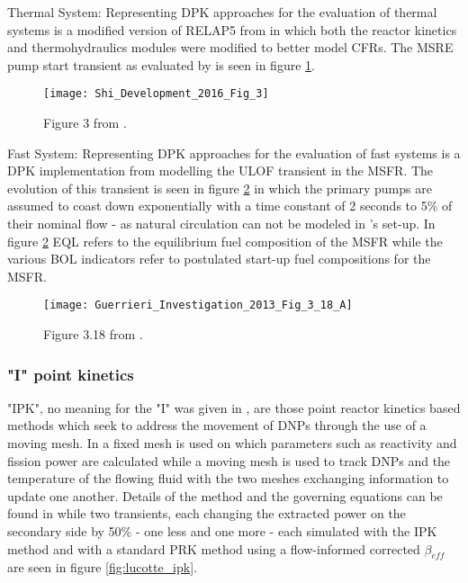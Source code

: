 \documentclass[review]{elsarticle}
\begin{document}
\par Thermal System: Representing DPK approaches for the evaluation of thermal
systems is a modified version of RELAP5 from \cite{shi_development_2016} in
which both the reactor kinetics and thermohydraulics modules were modified
to better model CFRs. The MSRE pump start transient as evaluated by
\cite{shi_development_2016} is seen in figure \ref{fig:shi_msre_ps}.

\begin{figure}[h]
   \centering
   \texttt{[image: Shi\_Development\_2016\_Fig\_3]}
   \caption{Figure 3 from \cite{shi_development_2016}.} 
   \label{fig:shi_msre_ps}
\end{figure}

\par Fast System: Representing DPK approaches for the evaluation of fast
systems is a DPK implementation from \cite{guerrieri_investigation_2013}
modelling the ULOF transient in the MSFR. The evolution of this transient is
seen in figure \ref{fig:guerrieri_msfr_ulof} in which the primary pumps are
assumed to coast down exponentially with a time constant of 2 seconds to 5\%
 of their nominal flow - as natural circulation can not be modeled in
\cite{guerrieri_investigation_2013}'s set-up. In figure 
\ref{fig:guerrieri_msfr_ulof} 
EQL refers to the equilibrium fuel composition of the
MSFR while the various BOL indicators refer to postulated start-up fuel
compositions for the MSFR. 

\begin{figure}[h]
   \centering
   \texttt{[image: Guerrieri\_Investigation\_2013\_Fig\_3\_18\_A]}
   \caption{Figure 3.18 from \cite{guerrieri_investigation_2013}.} 
   \label{fig:guerrieri_msfr_ulof}
\end{figure}


\subsubsection{"I" point kinetics} \label{sssec:spk}
"IPK", no meaning for the "I" was given in \cite{merle-lucotte_physical_2015},
are those point reactor kinetics based methods which seek to address the
movement of DNPs through the use of a moving mesh. In
\cite{merle-lucotte_physical_2015} a fixed mesh is used on which parameters
such as reactivity and fission power are calculated while a moving mesh is
used to track DNPs and the temperature of the flowing fluid with the two
meshes exchanging information to update one another. Details of the method and
the governing equations can be found in \cite{merle-lucotte_physical_2015} while
two transients, each changing the extracted power on the secondary side by
50\% - one less and one more - each simulated with the IPK method and with a
standard PRK method using a flow-informed corrected $\beta_{eff}$ are seen
in figure \ref{fig:lucotte_ipk}.
\end{document}
